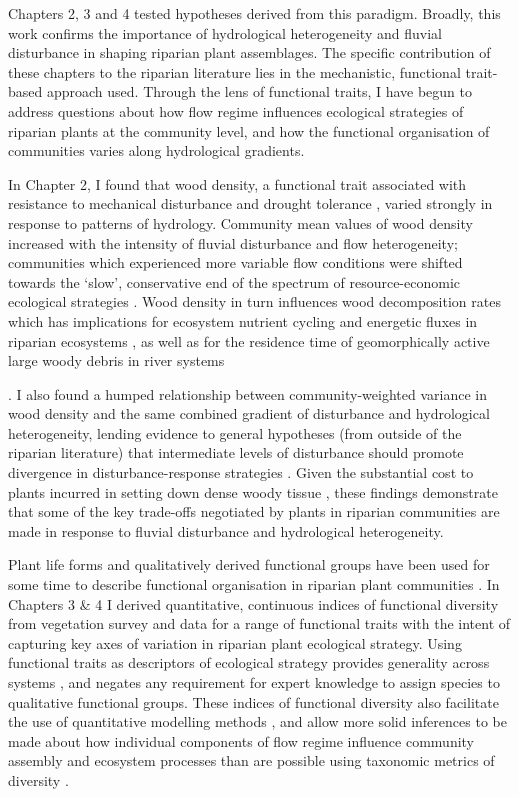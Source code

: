 \documentclass[openright,12pt,a4paper]{memoir}
\begin{document}
Chapters 2, 3 and 4 tested hypotheses derived from this paradigm. Broadly, this work confirms the importance of hydrological heterogeneity and fluvial disturbance in shaping riparian plant assemblages. The specific contribution of these chapters to the riparian literature lies in the mechanistic, functional trait-based approach used. Through the lens of functional traits, I have begun to address questions about how flow regime influences ecological strategies of riparian plants at the community level, and how the functional organisation of communities varies along hydrological gradients.

In Chapter 2, I found that wood density, a functional trait associated with resistance to mechanical disturbance and drought tolerance \citep{Chave2009, Niklas2010}, varied strongly in response to patterns of hydrology. Community mean values of wood density increased with the intensity of fluvial disturbance and flow heterogeneity; communities which experienced more variable flow conditions were shifted towards the ‘slow’, conservative end of the spectrum of resource-economic ecological strategies \citep{Reich2014a}. Wood density in turn influences wood decomposition rates \citep{Mori2013} which has implications for ecosystem nutrient cycling and energetic fluxes in riparian ecosystems \citep{Harmon1986}, as well as for the residence time of geomorphically active large woody debris in river systems {\citep{Gurnell2002, Cadol2010}. I also found a humped relationship between community-weighted variance in wood density and the same combined gradient of disturbance and hydrological heterogeneity, lending evidence to general hypotheses (from outside of the riparian literature) that intermediate levels of disturbance should promote divergence in disturbance-response strategies \citep{Grime2006, Sonnier2010}. Given the substantial cost to plants incurred in setting down dense woody tissue \citep{Falster2006}, these findings demonstrate that some of the key trade-offs negotiated by plants in riparian communities are made in response to fluvial disturbance and hydrological heterogeneity.
 
Plant life forms and qualitatively derived functional groups have been used for some time to describe functional organisation in riparian plant communities \citep{Brinson1993, Stromberg2010, Stromberg2013}. In Chapters 3 \& 4 I derived quantitative, continuous indices of functional diversity from vegetation survey and data for a range of functional traits with the intent of capturing key axes of variation in riparian plant ecological strategy. Using functional traits as descriptors of ecological strategy provides generality across systems \citep{Lavorel2002, Suding2008}, and negates any requirement for expert knowledge to assign species to qualitative functional groups. These indices of functional diversity also facilitate the use of quantitative modelling methods \citep{Mason2013}, and allow more solid inferences to be made about how individual components of flow regime influence community assembly and ecosystem processes than are possible using taxonomic metrics of diversity \citep{Tilman1997, Diaz1998}.

}
\end{document}
